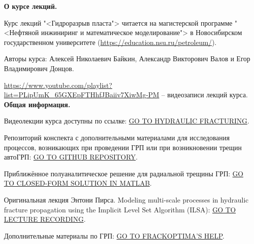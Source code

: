 \documentclass[main.tex]{subfiles}
\begin{document}
\textbf{О курсе лекций.}

Курс лекций "<Гидроразрыв пласта"> читается на магистерской программе "<Нефтяной инжиниринг и математическое моделирование"> в Новосибирском государственном университете (\url{https://education.nsu.ru/petroleum/}).

Авторы курса: Алексей Николаевич Байкин, Александр Викторович Валов и Егор Владимирович Донцов.

\url{https://www.youtube.com/playlist?list=PLipUmK_65GXEpFTHhfJBaiiv7XiwMg-PM} -- видеозаписи лекций курса.\\

\textbf{Общая информация.}

Видеолекции курса доступны по ссылке: \href{https://youtube.com/playlist?list=PLipUmK_65GXEpFTHhfJBaiiv7XiwMg-PM}{GO TO HYDRAULIC FRACTURING}.

Репозиторий конспекта с дополнительными материалами для исследования процессов, возникающих при проведении ГРП или при возникновении трещин автоГРП: \href{https://github.com/mualal/hydrofracturing}{GO TO GITHUB REPOSITORY}.

Приближённое полуаналитическое решение для радиальной трещины ГРП: \href{https://datadryad.org/stash/dataset/doi:10.5061/dryad.gh469}{GO TO CLOSED-FORM SOLUTION IN MATLAB}.

Оригинальная лекция Энтони Пирса. Modeling multi-scale processes in hydraulic fracture propagation using the Implicit Level Set Algorithm (ILSA): \href{https://www.youtube.com/watch?v=PXfy5f9kWh4}{GO TO LECTURE RECORDING}.

Дополнительные материалы по ГРП: \href{http://www.frackoptima.com/userguide/index.html}{GO TO FRACKOPTIMA'S HELP}.
\end{document}
